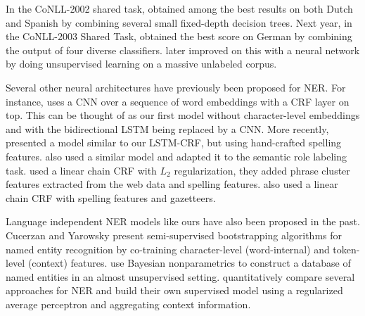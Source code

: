 \documentclass[11pt,letterpaper]{article}
\newcommand{\ignore}[1]{}
\begin{document}


In the CoNLL-2002 shared task,  obtained among the best results on both Dutch and Spanish by combining several small fixed-depth decision trees. Next year, in the CoNLL-2003 Shared Task,  obtained the best score on German by combining the output of four diverse classifiers.  later improved on this with a neural network by doing unsupervised learning on a massive unlabeled corpus.\ignore{ Both of these models use spelling features, and \newcite{florian2003named} used an external list of gazetteers.}

Several other neural architectures have previously been proposed for NER. For instance,  uses a CNN over a sequence of word embeddings with a CRF layer on top. This can be thought of as our first model without character-level embeddings and with the bidirectional LSTM being replaced by a CNN. More recently,  presented a model similar to our LSTM-CRF, but using hand-crafted spelling features.  also used a similar model and adapted it to the semantic role labeling task.  used a linear chain CRF with $L_2$ regularization, they added phrase cluster features extracted from the web data and spelling features.  also used a linear chain CRF with spelling features and gazetteers.%

Language independent NER models like ours have also been proposed in the past. Cucerzan and Yarowsky  present semi-supervised bootstrapping algorithms for named entity recognition by co-training character-level (word-internal) and token-level (context) features.  use Bayesian nonparametrics to construct a database of named entities in an almost unsupervised setting.  quantitatively compare several approaches for NER and build their own supervised model using a regularized average perceptron and aggregating context information.
\end{document}
